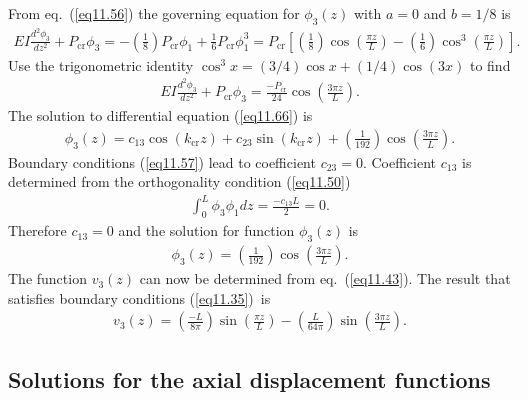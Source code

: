 \documentclass{AeroStructure-ERJohnson}
\begin{document}
From eq.~(\ref{eq11.56}) the governing equation for $\phi_{3}(z)$ with $a=0$ and $b=1/8$ is
\begin{align}\label{eq11.65}
E I \frac{d^{2} \phi_{3}}{d z^{2}}+P_{\mathrm{cr}} \phi_{3}=-\left(\frac{1}{8}\right) P_{\mathrm{cr}} \phi_{1}+\frac{1}{6} P_{\mathrm{cr}} \phi_{1}^{3}=P_{\mathrm{cr}}\left[\left(\frac{1}{8}\right) \cos \left(\frac{\pi z}{L}\right)-\left(\frac{1}{6}\right) \cos ^{3}\left(\frac{\pi z}{L}\right)\right].
\end{align}
Use the trigonometric identity $\cos ^{3} x=(3/4) \cos x+(1/4) \cos (3 x)$ to find
\begin{align}\label{eq11.66}
E I \frac{d^{2} \phi_{3}}{d z^{2}}+P_{\textrm{cr}} \phi_{3}=\frac{-P_{\mathrm{cr}}}{24} \cos \left(\frac{3 \pi z}{L}\right).
\end{align}
The solution to differential equation (\ref{eq11.66}) is
\begin{align}\label{eq11.67}
\phi_{3}(z)=c_{13} \cos \left(k_{\textrm{cr}} z\right)+c_{23} \sin \left(k_{\textrm{cr}} z\right)+\left(\frac{1}{192}\right) \cos \left(\frac{3 \pi z}{L}\right).
\end{align}
Boundary conditions (\ref{eq11.57}) lead to coefficient $c_{23}=0$. Coefficient $c_{13}$ is determined from the orthogonality condition (\ref{eq11.50})\vspace*{-0.6pc}
\begin{align}\label{eq11.68}
\int_{0}^{L} \phi_{3} \phi_{1} d z=\frac{-c_{13} L}{2}=0.
\end{align}
Therefore $c_{13}=0$ and the solution for function $\phi_{3}(z)$ is
\begin{align}\label{eq11.69}
\phi_{3}(z)=\left(\frac{1}{192}\right) \cos \left(\frac{3 \pi z}{L}\right).
\end{align}
The function $v_{3}(z)$ can now be determined from eq.~(\ref{eq11.43}). The result that satisfies boundary conditions (\ref{eq11.35})~is
\begin{align}\label{eq11.70}
v_{3}(z)=\left(\frac{-L}{8 \pi}\right) \sin \left(\frac{\pi z}{L}\right)-\left(\frac{L}{64 \pi}\right) \sin \left(\frac{3 \pi z}{L}\right).
\end{align}

\subsection{Solutions for the axial displacement functions}\label{sec11.2.6}
\end{document}
